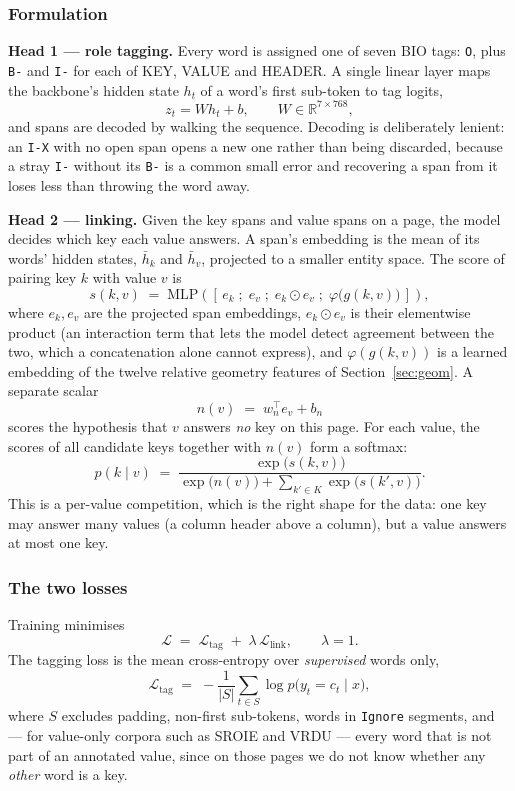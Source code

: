 \documentclass[11pt,a4paper]{article}
\newcommand{\code}[1]{\texttt{\small #1}}
\begin{document}
\subsubsection{Formulation}

\textbf{Head 1 --- role tagging.} Every word is assigned one of seven BIO tags: \code{O}, plus
\code{B-} and \code{I-} for each of KEY, VALUE and HEADER. A single linear layer maps the
backbone's hidden state $h_t$ of a word's first sub-token to tag logits,
\[
  z_t = W h_t + b, \qquad W \in \mathbb{R}^{7 \times 768},
\]
and spans are decoded by walking the sequence. Decoding is deliberately lenient: an \code{I-X}
with no open span opens a new one rather than being discarded, because a stray \code{I-} without
its \code{B-} is a common small error and recovering a span from it loses less than throwing the
word away.

\textbf{Head 2 --- linking.} Given the key spans and value spans on a page, the model decides
which key each value answers. A span's embedding is the mean of its words' hidden states,
$\bar h_k$ and $\bar h_v$, projected to a smaller entity space. The score of pairing key $k$ with
value $v$ is
\[
  s(k, v) \;=\; \mathrm{MLP}\!\left(\left[\, e_k \;;\; e_v \;;\; e_k \odot e_v \;;\;
  \varphi\big(g(k,v)\big) \,\right]\right),
\]
where $e_k, e_v$ are the projected span embeddings, $e_k \odot e_v$ is their elementwise product
(an interaction term that lets the model detect agreement between the two, which a concatenation
alone cannot express), and $\varphi(g(k,v))$ is a learned embedding of the twelve relative
geometry features of Section~\ref{sec:geom}. A separate scalar
\[
  n(v) \;=\; w_n^{\top} e_v + b_n
\]
scores the hypothesis that $v$ answers \emph{no} key on this page. For each value, the scores of
all candidate keys together with $n(v)$ form a softmax:
\[
  p(k \mid v) \;=\;
  \frac{\exp\big(s(k,v)\big)}{\exp\big(n(v)\big) + \sum_{k' \in K} \exp\big(s(k',v)\big)}.
\]
This is a per-value competition, which is the right shape for the data: one key may answer many
values (a column header above a column), but a value answers at most one key.

\subsubsection{The two losses}

Training minimises
\[
  \mathcal{L} \;=\; \mathcal{L}_{\text{tag}} \;+\; \lambda\, \mathcal{L}_{\text{link}},
  \qquad \lambda = 1 .
\]
The tagging loss is the mean cross-entropy over \emph{supervised} words only,
\[
  \mathcal{L}_{\text{tag}} \;=\; -\frac{1}{|S|}\sum_{t \in S} \log p\big(y_t = c_t \mid x\big),
\]
where $S$ excludes padding, non-first sub-tokens, words in \code{Ignore} segments, and --- for
value-only corpora such as SROIE and VRDU --- every word that is not part of an annotated value,
since on those pages we do not know whether any \emph{other} word is a key.
\end{document}
